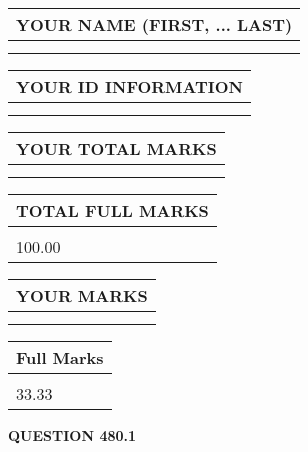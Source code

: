 \documentclass{ctexart}
\begin{document}
   
   
   
\newpage 
\setcounter{page}{ 
   480001 } 
   
   
   
   
\noindent\begin{tabular}{|l|}
\hline
YOUR NAME (FIRST, ... LAST)  \\
\hline
 \\ 
 \\ 
\hline
\end{tabular}
\hspace{0.05in} \begin{tabular}{|l|}
\hline
 YOUR   ID   INFORMATION  \\
\hline
 \\ 
 \\ 
\hline
\end{tabular}
   
   
\vspace{0.2in}\noindent\begin{tabular}{|l|}
\hline
YOUR TOTAL MARKS  \\
\hline
 \\ 
 \\ 
\hline
\end{tabular}
\hspace{0.05in} \begin{tabular}{|l|}
\hline
TOTAL FULL MARKS  \\
\hline
 \\ 
100.00 \\
\hline
\end{tabular}
   
   
 \vspace{0.2in}
 
 
 
 
   
   
  
\vspace{0.2in}
  
\noindent\begin{tabular}{|l|}
\hline
 YOUR MARKS  \\
\hline
 \\ 
 \\ 
\hline
\end{tabular}
\hspace{0.05in} \begin{tabular}{|l|}
\hline
 Full Marks  \\
\hline
 \\ 
33.33 \\
\hline
\end{tabular}
{\textbf{\Large{QUESTION
480.1 
}}}
  
\end{document}
